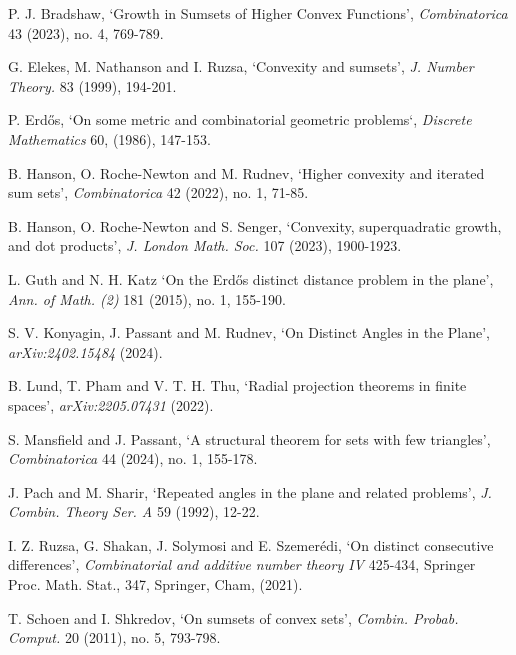 \documentclass[11pt,oneside]{amsart}
\numberwithin{exercise}{subsection}
\begin{document}
\begin{thebibliography}{99}


P. J. Bradshaw, `Growth in Sumsets of Higher Convex Functions', \textit{Combinatorica} 43 (2023), no. 4, 769-789.


 G. Elekes, M. Nathanson and I. Ruzsa, `Convexity and sumsets', \textit{J. Number Theory.} 83 (1999), 194-201.

 P. Erd\H{o}s, `On some metric and combinatorial geometric problems`, \textit{Discrete Mathematics} 60, (1986), 147-153.






 B. Hanson, O. Roche-Newton and M. Rudnev, `Higher convexity and iterated sum sets',  \textit{Combinatorica} 42 (2022), no. 1, 71-85.



 B. Hanson, O. Roche-Newton and S. Senger, `Convexity, superquadratic growth, and dot products', \textit{J. London Math. Soc.} 107 (2023), 1900-1923.

 L. Guth and N. H. Katz `On the Erd\H{o}s distinct distance problem in the plane', \textit{Ann. of Math. (2)} 181 (2015), no. 1, 155-190.






 S. V. Konyagin, J. Passant and M. Rudnev, `On Distinct Angles in the Plane', \textit{arXiv:2402.15484} (2024).

 B. Lund, T. Pham and V. T. H. Thu, `Radial projection theorems in finite spaces', \textit{arXiv:2205.07431} (2022).



 S. Mansfield and J. Passant, `A structural theorem for sets with few triangles', \textit{Combinatorica} 44 (2024), no. 1, 155-178.



 J. Pach and M. Sharir, `Repeated angles in the plane and related problems', \textit{ J. Combin. Theory Ser. A} 59 (1992), 12-22.




		



 I. Z. Ruzsa, G. Shakan, J. Solymosi and E. Szemer\'{e}di, `On distinct consecutive differences',  \textit{Combinatorial and additive number theory IV} 425-434,
Springer Proc. Math. Stat., 347, Springer, Cham, (2021).

 T. Schoen and I. Shkredov, `On sumsets of convex sets', \textit{Combin. Probab. Comput.} 20 (2011), no. 5, 793-798.  




	


\end{thebibliography}
\end{document}

